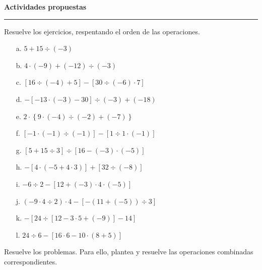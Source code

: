 \documentclass[spanish,letterpaper, 11pt, addpoints, answers]{exam}
\begin{document}
\begin{questions}
\begin{itemize}
    \end{itemize}
    
    \parbox{6in}{
    \textbf{Actividades propuestas}}
    \vspace{0.15in}
    \hrule 
  
    \question Resuelve los ejercicios, respentando el orden de las operaciones.
    \begin{multicols}{2}
      \begin{itemize}
        \item[a.] $5+15\div (-3)$
        \vspace{3cm}
        \item[b.] $4\cdot (-9)+(-12)\div (-3)$
        \vspace{3cm}
        \item[c.] $[16\div (-4)+5]-[30\div (-6)\cdot 7]$
        \vspace{3cm}
        \item[d.] $-[-13\cdot (-3)-30]\div (-3)+(-18)$ 
        \vspace{3cm}
        \item[e.] $2\cdot \left\{ 9\cdot (-4)\div (-2)+(-7)\right\}$
        \vspace{3cm}
        \item[f.] $[-1\cdot (-1)\div (-1)]-[1\div 1\cdot (-1)]$
        \vspace{3cm}
        \item[g.] $[5+15\div 3]\div [16-(-3)\cdot (-5)]$
        \vspace{3cm}
        \item[h.] $-[4\cdot (-5+4\cdot 3)]+[32\div (-8)]$
        \vspace{3cm}
        \item[i.] $-6\div 2-[12+(-3)\cdot 4\cdot (-5)]$
        \vspace{3cm}
        \item[j.] $(-9\cdot 4\div 2)\cdot 4-[-(11+(-5))\div 3]$
        \vspace{3cm}
        \item[k.] $-[24\div [12-3\cdot 5+(-9)]-14]$
        \vspace{3cm}
        \item[l.] $24\div 6-[16\cdot 6-10\cdot (8+5)]$   
      \end{itemize}
      
    \end{multicols}

    \question Resuelve los problemas. Para ello, plantea y resuelve las operaciones combinadas correspondientes.


\end{questions}
\end{document}
